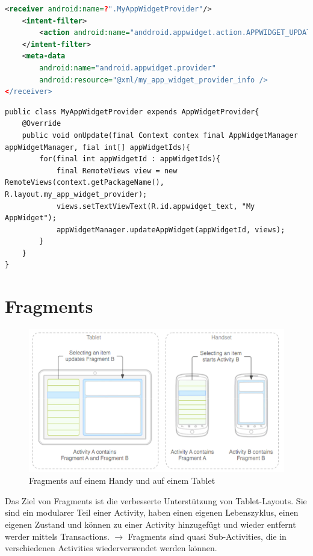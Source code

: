 \documentclass[a4paper, 11pt]{article}
\begin{document}
\begin{lstlisting}[language=xml, caption={Widget Deklaration im Manifest}]
<receiver android:name=?".MyAppWidgetProvider"/>
	<intent-filter>
		<action android:name="anddroid.appwidget.action.APPWIDGET_UPDATE"/>
	</intent-filter>
	<meta-data
		android:name="android.appwidget.provider"
		android:resource="@xml/my_app_widget_provider_info />
</receiver>
\end{lstlisting}

\begin{lstlisting}[caption={Widget-Klasse}]
public class MyAppWidgetProvider expends AppWidgetProvider{
	@Override
	public void onUpdate(final Context contex final AppWidgetManager appWidgetManager, fial int[] appWidgetIds){
		for(final int appWidgetId : appWidgetIds){
			final RemoteViews view = new RemoteViews(context.getPackageName(), R.layout.my_app_widget_provider);
			views.setTextViewText(R.id.appwidget_text, "My AppWidget");
			appWidgetManager.updateAppWidget(appWidgetId, views);
		}
	}
}
\end{lstlisting}

\section{Fragments}
\begin{figure}[htb]
	\centering
	\includegraphics[keepaspectratio=true,height=15\baselineskip]{fragments.PNG}
	\caption{Fragments auf einem Handy und auf einem Tablet}
	\label{fig:fragments}
\end{figure}

Das Ziel von Fragments ist die verbesserte Unterstützung von Tablet-Layouts. Sie sind ein modularer Teil einer Activity, haben einen eigenen Lebenszyklus, einen eigenen Zustand und können zu einer Activity hinzugefügt und wieder entfernt werder mittels Transactions. $\rightarrow$ Fragments sind quasi Sub-Activities, die in verschiedenen Activities wiederverwendet werden können.
\vspace{10px}
\end{document}
